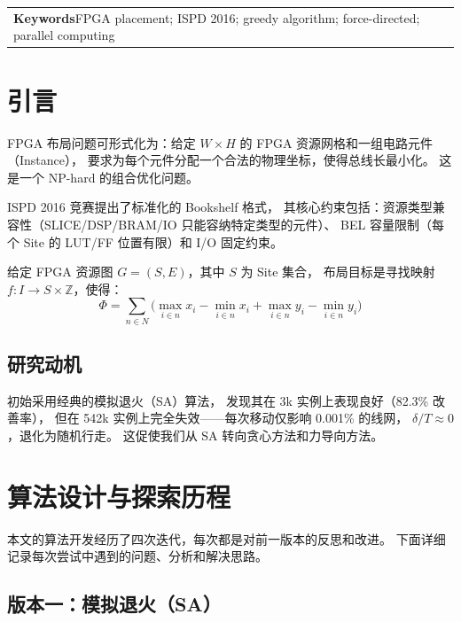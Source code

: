\documentclass[10.5pt,compsoc]{CjC}
\theoremstyle{mystyle}
\begin{document}
\begin{table}[!t]
\begin{tabular}{p{160mm}}
\vspace{2mm}
{\bf Keywords}\quad FPGA placement; ISPD 2016; greedy algorithm; force-directed; parallel computing
\end{tabular}

\end{table}

\clearpage
\vspace{-13mm}
\linespread{1.15}
\normalfont\songti
{}
\vskip 1mm

\section{引言}

FPGA 布局问题可形式化为：给定 $W \times H$ 的 FPGA 资源网格和一组电路元件（Instance），
要求为每个元件分配一个合法的物理坐标，使得总线长最小化\cite{ispd2016}。
这是一个 NP-hard 的组合优化问题。

ISPD 2016 竞赛提出了标准化的 Bookshelf 格式，
其核心约束包括：资源类型兼容性（SLICE/DSP/BRAM/IO 只能容纳特定类型的元件）、
BEL 容量限制（每个 Site 的 LUT/FF 位置有限）和 I/O 固定约束\cite{dreamplace2022}。

给定 FPGA 资源图 $G = (S, E)$，其中 $S$ 为 Site 集合，
布局目标是寻找映射 $f: I \rightarrow S \times \mathbb{Z}$，使得：
\begin{equation}
\Phi = \sum_{n \in N} \bigl(\max_{i \in n} x_i - \min_{i \in n} x_i + \max_{i \in n} y_i - \min_{i \in n} y_i\bigr)
\label{eq:hpwl}
\end{equation}

\subsection{研究动机}

初始采用经典的模拟退火（SA）算法，
发现其在 3k 实例上表现良好（82.3\% 改善率），
但在 542k 实例上完全失效——每次移动仅影响 0.001\% 的线网，
$\delta / T \approx 0$，退化为随机行走。
这促使我们从 SA 转向贪心方法和力导向方法。

\section{算法设计与探索历程}

本文的算法开发经历了四次迭代，每次都是对前一版本的反思和改进。
下面详细记录每次尝试中遇到的问题、分析和解决思路。

\subsection{版本一：模拟退火（SA）}
\end{document}

